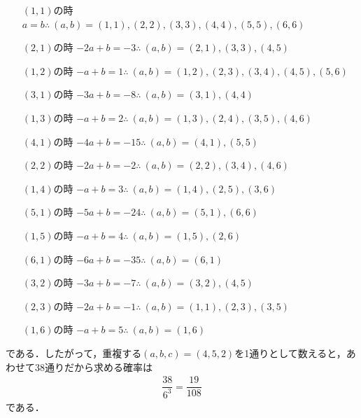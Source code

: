 \documentclass[../../main.tex]{subfiles}
\begin{document}
\begin{enumerate}
  \item[$(1,1)$の時] $a=b \therefore\ (a,b)=(1,1),(2,2),(3,3),(4,4),(5,5),(6,6)$
  \item[$(2,1)$の時] $-2a+b=-3 \therefore\ (a,b)=(2,1),(3,3),(4,5)$
  \item[$(1,2)$の時] $-a+b=1 \therefore\ (a,b)=(1,2),(2,3),(3,4),(4,5),(5,6)$
  \item[$(3,1)$の時] $-3a+b=-8 \therefore\ (a,b)=(3,1),(4,4)$
  \item[$(1,3)$の時] $-a+b=2 \therefore\ (a,b)=(1,3),(2,4),(3,5),(4,6)$
  \item[$(4,1)$の時] $-4a+b=-15 \therefore\ (a,b)=(4,1),(5,5)$
  \item[$(2,2)$の時] $-2a+b=-2 \therefore\ (a,b)=(2,2),(3,4),(4,6)$
  \item[$(1,4)$の時] $-a+b=3 \therefore\ (a,b)=(1,4),(2,5),(3,6)$
  \item[$(5,1)$の時] $-5a+b=-24 \therefore\ (a,b)=(5,1),(6,6)$
  \item[$(1,5)$の時] $-a+b=4 \therefore\ (a,b)=(1,5),(2,6)$
  \item[$(6,1)$の時] $-6a+b=-35 \therefore\ (a,b)=(6,1)$
  \item[$(3,2)$の時] $-3a+b=-7 \therefore\ (a,b)=(3,2),(4,5)$
  \item[$(2,3)$の時] $-2a+b=-1 \therefore\ (a,b)=(1,1),(2,3),(3,5)$
  \item[$(1,6)$の時] $-a+b=5 \therefore\ (a,b)=(1,6)$
\end{enumerate}
である．したがって，重複する$(a,b,c)=(4,5,2)$を1通りとして数えると，あわせて38通りだから求める確率は
\begin{align}
  \dfrac{38}{6^3}=\dfrac{19}{108}
\end{align}
である．
\end{document}
